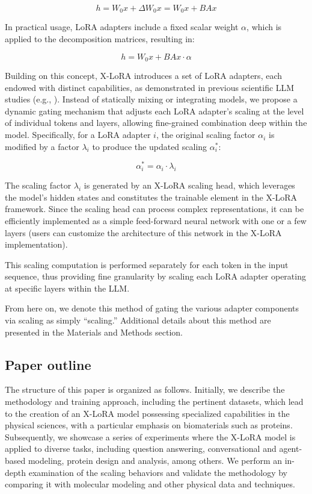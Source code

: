\begin{equation}
    h = W_0x + \Delta W_0x = W_0x + BAx
\end{equation}

In practical usage, LoRA adapters include a fixed scalar weight $\alpha$, which is applied to the decomposition matrices, resulting in:

\begin{equation}
    h = W_0x + BAx \cdot \alpha
\end{equation}

Building on this concept, X-LoRA introduces a set of LoRA adapters, each endowed with distinct capabilities, as demonstrated in previous scientific LLM studies (e.g., \cite{Buehler2023GenerativeDesign}). Instead of statically mixing or integrating models, we propose a dynamic gating mechanism that adjusts each LoRA adapter's scaling at the level of individual tokens and layers, allowing fine-grained combination deep within the model. Specifically, for a LoRA adapter $i$, the original scaling factor $\alpha_i$ is modified by a factor $\lambda_i$ to produce the updated scaling $\alpha^*_i$:

\begin{equation}
    \alpha^*_i = \alpha_i \cdot \lambda_i
\end{equation}

The scaling factor $\lambda_i$ is generated by an X-LoRA scaling head, which leverages the model’s hidden states and constitutes the trainable element in the X-LoRA framework. Since the scaling head can process complex representations, it can be efficiently implemented as a simple feed-forward neural network with one or a few layers (users can customize the architecture of this network in the X-LoRA implementation).

This scaling computation is performed separately for each token in the input sequence, thus providing fine granularity by scaling each LoRA adapter operating at specific layers within the LLM.

From here on, we denote this method of gating the various adapter components via scaling as simply “scaling.” Additional details about this method are presented in the Materials and Methods section.

\subsection{Paper outline}

The structure of this paper is organized as follows. Initially, we describe the methodology and training approach, including the pertinent datasets, which lead to the creation of an X-LoRA model possessing specialized capabilities in the physical sciences, with a particular emphasis on biomaterials such as proteins. Subsequently, we showcase a series of experiments where the X-LoRA model is applied to diverse tasks, including question answering, conversational and agent-based modeling, protein design and analysis, among others. We perform an in-depth examination of the scaling behaviors and validate the methodology by comparing it with molecular modeling and other physical data and techniques.

